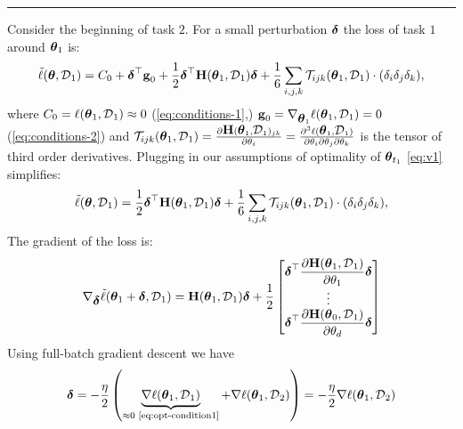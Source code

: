 \documentclass{article} %
\newcommand{\hessian}{\vH}
\newcommand{\lighthline}{\noindent\textcolor{gray!50}{\rule{\linewidth}{0.4pt}}}
\begin{document}
\lighthline



Consider the beginning of task $2$. For a small perturbation $\mbox{$\mbox{$\boldsymbol{\delta}$}$}$ the loss of task $1$ around $\mbox{$\mbox{$\boldsymbol{\theta}$}$}_{1}$ is:
\begin{equation}
\label{eq:v1}
        \tilde{\loss}(\vparam, \data_{1}) =  C_0 + \vdelta^\top\vg_0 + \frac{1}{2}\vdelta^\top\hessian(\vparam_1, \data_{1})\vdelta + \frac{1}{6}\sum_{i,j,k}\mathcal{T}_{ijk}(\vparam_1, \data_{1})\cdot (\delta_i\delta_j\delta_k),
\end{equation}
where $C_0 = \ell(\mbox{$\mbox{$\boldsymbol{\theta}$}$}_1, \mbox{${\cal D}$}_{1})\approx0$ (\cref{eq:conditions-1},) $\mbox{$\mbox{$\mathbf{g}$}$}_0 = \nabla_{\mbox{$\mbox{$\boldsymbol{\theta}$}$}_1}\ell(\mbox{$\mbox{$\boldsymbol{\theta}$}$}_1, \mbox{${\cal D}$}_{1}) = 0$ (\cref{eq:conditions-2}) and $\mathcal{T}_{ijk}(\vparam_1, \data_{1}) = \deriv{\hessian(\vparam_1, \data_{1})_{jk}}{\param_i} = \frac{\partial^3\loss(\vparam_1, \data_{1})}{\partial\param_i \partial\param_j\partial\param_k}$ is the tensor of third order derivatives. Plugging in our assumptions of optimality of $\mbox{$\mbox{$\boldsymbol{\theta}$}$}_{t_1}$ \cref{eq:v1} simplifies:
\begin{equation}
\label{eq:v2}
        \tilde{\loss}(\vparam, \data_{1}) =  \frac{1}{2}\vdelta^\top\hessian(\vparam_1, \data_{1})\vdelta + \frac{1}{6}\sum_{i,j,k}\mathcal{T}_{ijk}(\vparam_1, \data_{1})\cdot (\delta_i\delta_j\delta_k),
\end{equation}
The gradient of the loss is:
\begin{equation}
\label{eq:v2}
        \nabla_{\vdelta}\tilde{\loss}(\vparam_1 + \vdelta, \data_{1}) =  \hessian(\vparam_1, \data_{1})\vdelta + \frac{1}{2}
        \begin{bmatrix}
        \vdelta^\top \dfrac{\partial \hessian(\vparam_1, \data_{1})}{\partial \param_1} \vdelta \\
        \vdots \\
        \vdelta^\top \dfrac{\partial \hessian(\vparam_0, \data_{1})}{\partial \param_d} \vdelta
        \end{bmatrix}
\end{equation}
Using full-batch gradient descent we have 
\begin{equation}
    \vdelta = -\frac{\eta}{2}\rnd{\underbrace{\nabla\loss(\vparam_1,\data_1)}_{\approx 0 \text{ \cref{eq:opt-condition1}}} + \nabla\loss(\vparam_1,\data_2)} = -\frac{\eta}{2}\nabla\loss(\vparam_1,\data_2)
\end{equation}
\end{document}

